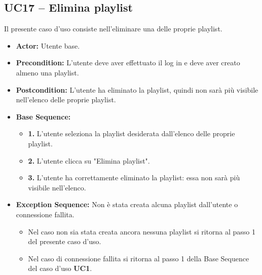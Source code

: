 \subsection{UC17 -- Elimina playlist}
Il presente caso d'uso consiste nell'eliminare una delle proprie playlist.
\begin{itemize}
    \item \textbf{Actor:} Utente base.
    \item \textbf{Precondition:} L'utente deve aver effettuato il log in e deve aver creato almeno una playlist.
    \item \textbf{Postcondition:} L'utente ha eliminato la playlist, quindi non sarà più visibile nell'elenco delle proprie playlist.
    \item \textbf{Base Sequence:}
    \begin{itemize}
        \item \textbf{1.} L'utente seleziona la playlist desiderata dall'elenco delle proprie playlist.
        \item \textbf{2.} L'utente clicca su "Elimina playlist".
        \item \textbf{3.} L'utente ha correttamente eliminato la playlist: essa non sarà più visibile nell'elenco.
    \end{itemize}
    \item \textbf{Exception Sequence:} Non è stata creata alcuna playlist dall'utente o connessione fallita.
    \begin{itemize}
        \item Nel caso non sia stata creata ancora nessuna playlist si ritorna al passo 1 del presente caso d'uso.
        \item Nel caso di connessione fallita si ritorna al passo 1 della Base Sequence del caso d'uso \textbf{UC1}.
    \end{itemize}
\end{itemize}
\vspace{1cm}

